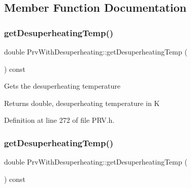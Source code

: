 \subsection{Member Function Documentation}
\mbox{\label{class_prv_with_desuperheating_af334a9ff9a14d110cb2851a76d5d84fb}} 
\subsubsection{\texorpdfstring{get\+Desuperheating\+Temp()}{getDesuperheatingTemp()}\hspace{0.1cm}{\footnotesize\ttfamily [1/3]}}
{\footnotesize\ttfamily double Prv\+With\+Desuperheating\+::get\+Desuperheating\+Temp (\begin{DoxyParamCaption}{ }\end{DoxyParamCaption}) const\hspace{0.3cm}{\ttfamily [inline]}}

Gets the desuperheating temperature

\begin{DoxyReturn}{Returns}
double, desuperheating temperature in K 
\end{DoxyReturn}


Definition at line 272 of file P\+R\+V.\+h.

\mbox{\label{class_prv_with_desuperheating_af334a9ff9a14d110cb2851a76d5d84fb}} 
\subsubsection{\texorpdfstring{get\+Desuperheating\+Temp()}{getDesuperheatingTemp()}\hspace{0.1cm}{\footnotesize\ttfamily [2/3]}}
{\footnotesize\ttfamily double Prv\+With\+Desuperheating\+::get\+Desuperheating\+Temp (\begin{DoxyParamCaption}{ }\end{DoxyParamCaption}) const\hspace{0.3cm}{\ttfamily [inline]}}

